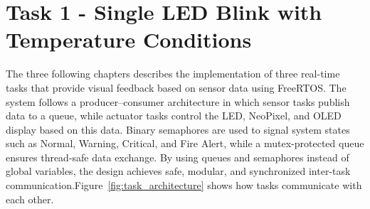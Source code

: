         


\chapter{Task 1 - Single LED Blink with Temperature Conditions}


The three following chapters describes the implementation of three real-time tasks that provide visual feedback based on sensor data using FreeRTOS. The system follows a producer–consumer architecture in which sensor tasks publish data to a queue, while actuator tasks control the LED, NeoPixel, and OLED display based on this data. Binary semaphores are used to signal system states such as Normal, Warning, Critical, and Fire Alert, while a mutex-protected queue ensures thread-safe data exchange. By using queues and semaphores instead of global variables, the design achieves safe, modular, and synchronized inter-task communication.Figure~\ref{fig:task_architecture} shows how tasks communicate with each other.

